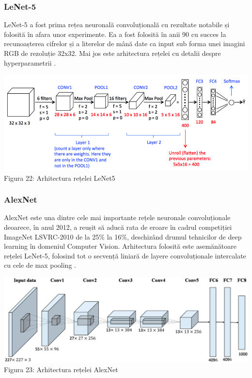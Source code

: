\subsubsection{LeNet-5}
LeNet-5 a fost prima rețea neuronală convoluțională cu rezultate notabile și folosită în afara unor experimente. Ea a fost folosită în anii 90 cu succes la recunoașterea cifrelor și a literelor de mână date ca input sub forma unei imagini RGB de rezoluție 32x32. Mai jos este arhitectura rețelei cu detalii despre hyperparametrii \cite{lenet}. 

\begin{center}
\includegraphics[scale=0.5]{LeNet5} \\
Figura 22: Arhitectura rețelei LeNet5
\end{center}

\subsubsection{AlexNet}
AlexNet este una dintre cele mai importante rețele neuronale convoluționale deoarece, în anul 2012, a reușit să aducă rata de eroare în cadrul competiției ImageNet LSVRC-2010 de la 25\% la 16\%, deschizând drumul tehnicilor de deep learning în domeniul Computer Vision. Arhitectura folosită este asemănătoare rețelei LeNet-5, folosind tot o secvență liniară de layere convoluționale intercalate cu cele de max pooling \cite{alexnet}. 

\begin{center}
\includegraphics[scale=1.5]{alexnet} \\
Figura 23: Arhitectura rețelei AlexNet
\end{center}

